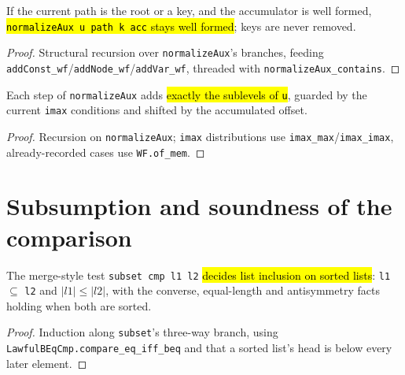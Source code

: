 \begin{theorem}
\label{thm:lvl-normalizeaux-wf}
\leanok
{}
 If the current path is the root or a key, and the accumulator is well formed,
\hl{\texttt{normalizeAux u path k acc} stays well formed}; keys are never removed.
\end{theorem}
\begin{proof}
\leanok
{} Structural recursion over \texttt{normalizeAux}'s branches, feeding
\texttt{addConst\_wf}/\texttt{addNode\_wf}/\texttt{addVar\_wf}, threaded with
\texttt{normalizeAux\_contains}.
\end{proof}

\begin{theorem}
\label{thm:lvl-normalizeaux-eval}
\leanok
{}
 Each step of \texttt{normalizeAux} adds \hl{exactly the sublevels of \texttt{u}},
guarded by the current \texttt{imax} conditions and shifted by the accumulated offset.
\end{theorem}
\begin{proof}
\leanok
{} Recursion on \texttt{normalizeAux}; \texttt{imax} distributions use
\texttt{imax\_max}/\texttt{imax\_imax}, already-recorded cases use \texttt{WF.of\_mem}.
\end{proof}

\section{Subsumption and soundness of the comparison}

\begin{lemma}
\label{fam:lvl-subset}
\leanok
{}

 The merge-style test \texttt{subset cmp l1 l2} \hl{decides list inclusion on sorted
lists}: \texttt{l1} $\subseteq$ \texttt{l2} and $|l1| \le |l2|$, with the converse, equal-length and
antisymmetry facts holding when both are sorted.
\end{lemma}
\begin{proof}
\leanok
{} Induction along \texttt{subset}'s three-way branch, using
\texttt{LawfulBEqCmp.compare\_eq\_iff\_beq} and that a sorted list's head is below every later
element.
\end{proof}

